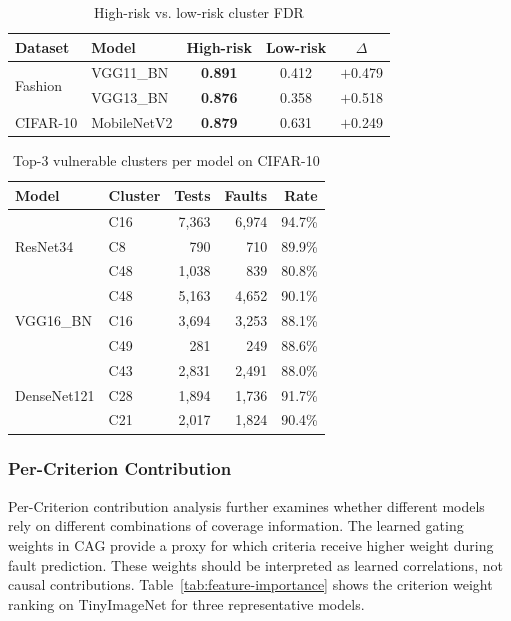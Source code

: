 \documentclass[preprint,number,5p,twocolumn]{elsarticle}
\begin{document}
\begin{table}[htbp]
  \centering
  \caption{High-risk vs. low-risk cluster FDR}\label{tab:cluster}
  \scriptsize
  \begin{tabular}{llccc}
    \toprule
    Dataset & Model & High-risk & Low-risk & $\Delta$ \\
    \midrule
    \multirow{2}{*}{Fashion}
      & VGG11\_BN   & \textbf{0.891} & 0.412 & $+$0.479 \\
      & VGG13\_BN   & \textbf{0.876} & 0.358 & $+$0.518 \\
    \midrule
    CIFAR-10
      & MobileNetV2 & \textbf{0.879} & 0.631 & $+$0.249 \\
    \bottomrule
  \end{tabular}
\end{table}
\begin{table}[htbp]
  \centering
  \caption{Top-3 vulnerable clusters per model on CIFAR-10}\label{tab:vulnerable}
  \scriptsize
  \begin{tabular}{llrrr}
    \toprule
    Model & Cluster & Tests & Faults & Rate \\
    \midrule
    \multirow{3}{*}{ResNet34}
      & C16 & 7{,}363 & 6{,}974 & 94.7\% \\
      & C8  &   790   &   710   & 89.9\% \\
      & C48 & 1{,}038 &   839   & 80.8\% \\
    \midrule
    \multirow{3}{*}{VGG16\_BN}
      & C48 & 5{,}163 & 4{,}652 & 90.1\% \\
      & C16 & 3{,}694 & 3{,}253 & 88.1\% \\
      & C49 &   281   &   249   & 88.6\% \\
    \midrule
    \multirow{3}{*}{DenseNet121}
      & C43 & 2{,}831 & 2{,}491 & 88.0\% \\
      & C28 & 1{,}894 & 1{,}736 & 91.7\% \\
      & C21 & 2{,}017 & 1{,}824 & 90.4\% \\
    \bottomrule
  \end{tabular}
\end{table}
\subsubsection{Per-Criterion Contribution}

Per-Criterion contribution analysis further examines whether different models rely on different combinations of coverage information. The learned gating weights in CAG provide a proxy for which criteria receive higher weight during fault prediction. These weights should be interpreted as learned correlations, not causal contributions. Table~\ref{tab:feature-importance} shows the criterion weight ranking on TinyImageNet for three representative models.
\end{document}
